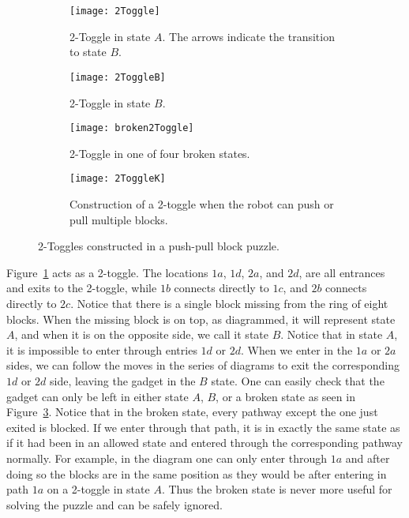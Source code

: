 \begin{figure}[!ht]
\centering
\begin{subfigure}[t]{0.45\textwidth}
  \centering
    \texttt{[image: 2Toggle]}
    \caption{2-Toggle in state $A$. The arrows indicate the transition to state $B$.}
    \label{fig:2toggleA}
\end{subfigure}
\begin{subfigure}[t]{0.45\textwidth}
  \centering
    \texttt{[image: 2ToggleB]}
    \caption{2-Toggle in state $B$.}
    \label{fig:2toggleB}
\end{subfigure}
    \begin{subfigure}[t]{0.45\textwidth}
  \centering
    \texttt{[image: broken2Toggle]}
    \caption{2-Toggle in one of four broken states.}
    \label{fig:broken2toggle}
    \end{subfigure}
  \begin{subfigure}[t]{.45\textwidth}
  \centering
    \texttt{[image: 2ToggleK]}
    \caption{Construction of a 2-toggle when the robot can push or pull multiple blocks.}
    \label{fig:2ToggleK}
    \end{subfigure}
    \caption{2-Toggles constructed in a push-pull block puzzle.}
\end{figure}

Figure~\ref{fig:2toggleA} acts as a 2-toggle. The locations $1a$, $1d$, $2a$, and $2d$, are all entrances and exits to the 2-toggle, while $1b$ connects directly to $1c$, and $2b$ connects directly to $2c$. Notice that there is a single block missing from the ring of eight blocks. When the missing block is on top, as diagrammed, it will represent state $A$, and when it is on the opposite side, we call it state $B$. Notice that in state $A$, it is impossible to enter through entries $1d$ or $2d$. When we enter in the $1a$ or $2a$ sides, we can follow the moves in the series of diagrams to exit the corresponding $1d$ or $2d$ side, leaving the gadget in the $B$ state. One can easily check that the gadget can only be left in either state $A$, $B$, or a broken state as seen in Figure~\ref{fig:broken2toggle}. Notice that in the broken state, every pathway except the one just exited is blocked. If we enter through that path, it is in exactly the same state as if it had been in an allowed state and entered through the corresponding pathway normally. For example, in the diagram one can only enter through $1a$ and after doing so the blocks are in the same position as they would be after entering in path $1a$ on a 2-toggle in state $A$. Thus the broken state is never more useful for solving the puzzle and can be safely ignored.

